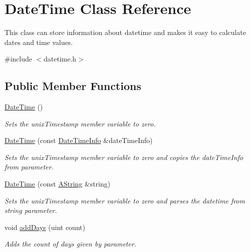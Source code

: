 \hypertarget{class_date_time}{}\section{Date\+Time Class Reference}
\label{class_date_time}


This class can store information about datetime and makes it easy to calculate dates and time values.  




{\ttfamily \#include $<$datetime.\+h$>$}

\subsection*{Public Member Functions}
\begin{DoxyCompactItemize}
\item 
\mbox{\label{class_date_time_a3ccfb87f7a2e9683b91964e32d907161}} 
\mbox{\hyperlink{class_date_time_a3ccfb87f7a2e9683b91964e32d907161}{Date\+Time}} ()
\begin{DoxyCompactList}\small\item\em Sets the unix\+Timestamp member variable to zero. \end{DoxyCompactList}\item 
\mbox{\hyperlink{class_date_time_acae25c3bcabd5636220ab73b4794b90e}{Date\+Time}} (const \mbox{\hyperlink{struct_date_time_info}{Date\+Time\+Info}} \&date\+Time\+Info)
\begin{DoxyCompactList}\small\item\em Sets the unix\+Timestamp member variable to zero and copies the date\+Time\+Info from parameter. \end{DoxyCompactList}\item 
\mbox{\hyperlink{class_date_time_aae5852ec64aa634b1e4a81effb7df049}{Date\+Time}} (const \mbox{\hyperlink{class_a_string}{A\+String}} \&string)
\begin{DoxyCompactList}\small\item\em Sets the unix\+Timestamp member variable to zero and parses the datetime from string parameter. \end{DoxyCompactList}\item 
void \mbox{\hyperlink{class_date_time_a9209722e2520862295252b12947d0f97}{add\+Days}} (uint count)
\begin{DoxyCompactList}\small\item\em Adds the count of days given by parameter. \end{DoxyCompactList}\item 

\end{DoxyCompactItemize}
